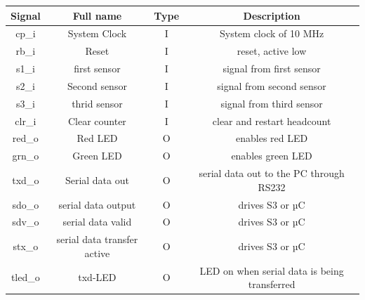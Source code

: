 \documentclass{article}
\begin{document}
    \begin{center}
             \begin{tabular}{|c|c|c|c|}
\hline
         
        Signal& Full name & Type& Description \\
        \hline
        \hline
        cp\_i& System Clock & I&  System clock of 10 MHz \\ 
        \hline
        rb\_i & Reset & I& reset, active low \\
        \hline 
        s1\_i & first sensor & I &signal from first sensor \\
        \hline
        s2\_i & Second sensor & I& signal from second sensor\\
        \hline 
        s3\_i & thrid sensor & I & signal from third sensor\\
        \hline
        clr\_i & Clear counter & I &clear and restart headcount \\
        \hline 
        red\_o & Red LED & O &enables red LED \\
        \hline
        grn\_o  & Green LED & O & enables green LED \\
        \hline
      
        txd\_o & Serial data out & O & serial data out to the PC through RS232\\
        \hline
        sdo\_o  & serial data output & O & drives S3 or µC\\
        \hline 
        sdv\_o & serial data valid & O &drives S3 or µC\\
        \hline
        stx\_o & serial data transfer active & O & drives S3 or µC \\
        \hline 
        tled\_o & txd-LED & O & LED on when serial data is being transferred\\
        \hline
        
           \end{tabular}
    \end{center}  
    \vspace {1.5cm}
\end{document}

